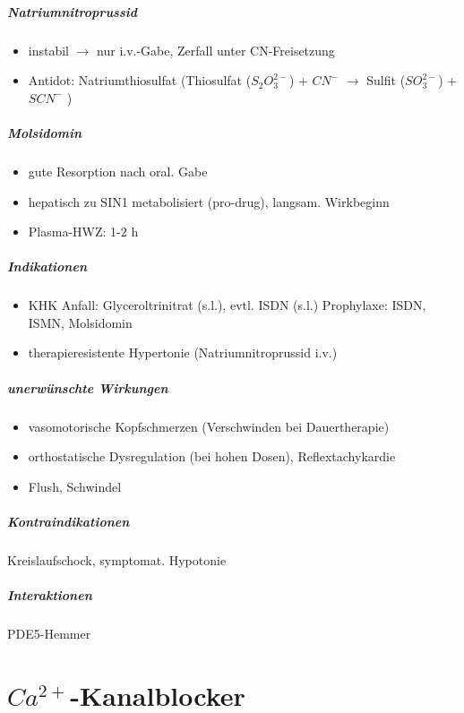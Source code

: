 \documentclass[10pt,a4paper]{report}
\begin{document}
\subparagraph{Natriumnitroprussid}
\begin{itemize}
	\item instabil $\rightarrow$ nur i.v.-Gabe, Zerfall unter CN-Freisetzung
	\item Antidot: Natriumthiosulfat (Thiosulfat ($S_2O_3^{2-}$) + $CN^-$ $\rightarrow$ Sulfit ($SO_3^{2-}$) + $SCN^-$ )
\end{itemize}

\subparagraph{Molsidomin}
\begin{itemize}
	\item gute Resorption nach oral. Gabe
	\item hepatisch zu SIN1 metabolisiert (pro-drug), langsam. Wirkbeginn
	\item Plasma-HWZ: 1-2 h
\end{itemize}

\subparagraph{Indikationen}
\begin{itemize}
	\item KHK Anfall: Glyceroltrinitrat (s.l.), evtl. ISDN (s.l.) Prophylaxe: ISDN, ISMN, Molsidomin
	\item therapieresistente Hypertonie (Natriumnitroprussid i.v.)
\end{itemize}

\subparagraph{unerwünschte Wirkungen}
\begin{itemize}
	\item vasomotorische Kopfschmerzen (Verschwinden bei Dauertherapie)
	\item orthostatische Dysregulation (bei hohen Dosen), Reflextachykardie
	\item Flush, Schwindel
\end{itemize}

\subparagraph{Kontraindikationen} Kreislaufschock, symptomat. Hypotonie

\subparagraph{Interaktionen} PDE5-Hemmer

\section{$Ca^{2+}$-Kanalblocker}
\end{document}

